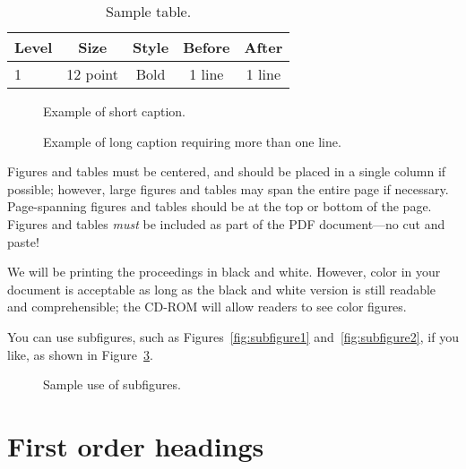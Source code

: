 \documentclass[10pt,twocolumn]{article}
\begin{document}
\begin{table}
\caption{Sample table.}
\label{tab:sample}
\begin{center}
\begin{tabular}{|l|c|c|c|c|} \hline
\textbf{Level} & \textbf{Size} & \textbf{Style} & \textbf{Before} & \textbf{After} \\ \hline \hline
1 & 12 point & Bold & 1 line & 1 line \\ \hline
\end{tabular}
\end{center}
\end{table}

\begin{figure}
  \centerline{}
  \caption{Example of short caption.}
  \label{fig:shortcaption}
\end{figure}

\begin{figure}
  \centerline{}
  \caption{Example of long caption requiring more than one line.}
  \label{fig:longcaption}
\end{figure}


Figures and tables must be centered, and should be placed in a single
column if possible; however, large figures and tables may span the
entire page if necessary.  Page-spanning figures and tables should be
at the top or bottom of the page.  Figures and tables \emph{must} be
included as part of the PDF document---no cut and paste!

We will be printing the proceedings in black and white.  However,
color in your document is acceptable as long as the black and white
version is still readable and comprehensible; the CD-ROM will allow
readers to see color figures.

You can use subfigures, such as Figures~\ref{fig:subfigure1}
and~\ref{fig:subfigure2}, if you like, as shown in
Figure~\ref{fig:subfigures}.

\begin{figure}
  \caption{Sample use of subfigures.}
  \label{fig:subfigures}
\end{figure}

\section{First order headings}
\end{document}
